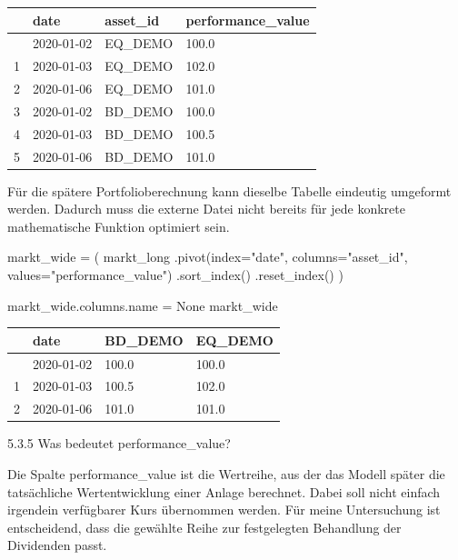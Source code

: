 \documentclass[
  ngerman,
  a4paper,
  DIV=11,
  oneside]{scrreprt}
\newenvironment{Shaded}{\begin{snugshade}}{\end{snugshade}}
\newcommand{\NormalTok}[1]{\textcolor[rgb]{0.00,0.23,0.31}{#1}}
\newcommand{\OperatorTok}[1]{\textcolor[rgb]{0.37,0.37,0.37}{#1}}
\newcommand{\StringTok}[1]{\textcolor[rgb]{0.13,0.47,0.30}{#1}}
\newcommand{\VariableTok}[1]{\textcolor[rgb]{0.07,0.07,0.07}{#1}}
\newcounter{none} %
\begin{document}
{\def\LTcaptype{none} %
\begin{longtable}[]{@{}llll@{}}
\toprule\noalign{}
& date & asset\_id & performance\_value \\
\midrule\noalign{}
\endhead
\bottomrule\noalign{}
\endlastfoot
0 & 2020-01-02 & EQ\_DEMO & 100.0 \\
1 & 2020-01-03 & EQ\_DEMO & 102.0 \\
2 & 2020-01-06 & EQ\_DEMO & 101.0 \\
3 & 2020-01-02 & BD\_DEMO & 100.0 \\
4 & 2020-01-03 & BD\_DEMO & 100.5 \\
5 & 2020-01-06 & BD\_DEMO & 101.0 \\
\end{longtable}
}

Für die spätere Portfolioberechnung kann dieselbe Tabelle eindeutig
umgeformt werden. Dadurch muss die externe Datei nicht bereits für jede
konkrete mathematische Funktion optimiert sein.

\begin{Shaded}
\begin{Highlighting}[]
\NormalTok{markt\_wide }\OperatorTok{=}\NormalTok{ (}
\NormalTok{    markt\_long}
\NormalTok{    .pivot(index}\OperatorTok{=}\StringTok{"date"}\NormalTok{, columns}\OperatorTok{=}\StringTok{"asset\_id"}\NormalTok{, values}\OperatorTok{=}\StringTok{"performance\_value"}\NormalTok{)}
\NormalTok{    .sort\_index()}
\NormalTok{    .reset\_index()}
\NormalTok{)}
    
\NormalTok{markt\_wide.columns.name }\OperatorTok{=} \VariableTok{None}
\NormalTok{markt\_wide}
\end{Highlighting}
\end{Shaded}

{\def\LTcaptype{none} %
\begin{longtable}[]{@{}llll@{}}
\toprule\noalign{}
& date & BD\_DEMO & EQ\_DEMO \\
\midrule\noalign{}
\endhead
\bottomrule\noalign{}
\endlastfoot
0 & 2020-01-02 & 100.0 & 100.0 \\
1 & 2020-01-03 & 100.5 & 102.0 \\
2 & 2020-01-06 & 101.0 & 101.0 \\
\end{longtable}
}

5.3.5 Was bedeutet performance\_value?

Die Spalte performance\_value ist die Wertreihe, aus der das Modell
später die tatsächliche Wertentwicklung einer Anlage berechnet. Dabei
soll nicht einfach irgendein verfügbarer Kurs übernommen werden. Für
meine Untersuchung ist entscheidend, dass die gewählte Reihe zur
festgelegten Behandlung der Dividenden passt.
\end{document}
